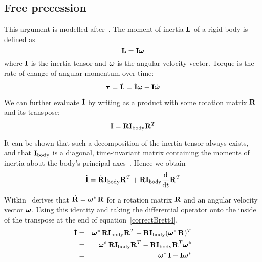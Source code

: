 \subsection{Free precession\label{correctBrettAppendix}}

This argument is modelled after~\cite{Ruf:02}. The moment of inertia $\ve{L}$ of a rigid
body is defined as
\begin{equation}
\label{correctBrett1}
\ve{L} = \m{I}\ve{\omega}
\end{equation}
where $\m{I}$ is the inertia tensor and $\ve{\omega}$ is the angular velocity vector.
Torque is the rate of change of angular momentum over time:
\begin{equation}
\label{correctBrett2}
\ve{\tau} = \dot{\ve{L}} = \dot{\m{I}}\ve{\omega} + \m{I}\dot{\ve{\omega}}
\end{equation}

We can further evaluate $\dot{\m{I}}$ by writing  as a product with some rotation matrix
$\m{R}$ and its transpose:
\begin{equation}
\label{correctBrett3}
\m{I} = \m{R}\m{I}_\mathrm{body}\m{R}^T
\end{equation}

It can be shown that such a decomposition of the inertia tensor always exists, and that
$\m{I}_\mathrm{body}$ is a diagonal, time-invariant matrix containing the moments
of inertia about the body's principal axes~\cite{Feynman:63}. Hence we obtain
\begin{equation}
\label{correctBrett4}
\dot{\m{I}} = \dot{\m{R}}\m{I}_\mathrm{body}\m{R}^T +
    \m{R}\m{I}_\mathrm{body}\frac{\diff}{\diff t}\m{R}^T
\end{equation}

Witkin~\cite{BaraffWitkin:97} derives that $\dot{\m{R}} = \dual{\ve{\omega}}\,\m{R}$
for a rotation matrix $\m{R}$ and an angular velocity vector $\ve{\omega}$.
Using this identity and taking the differential operator onto the inside of the
transpose at the end of equation~\ref{correctBrett4},
\begin{eqnarray}
\dot{\m{I}} &=& \dual{\ve{\omega}}\,\m{R}\m{I}_\mathrm{body}\m{R}^T +
    \m{R}\m{I}_\mathrm{body}(\dual{\ve{\omega}}\,\m{R})^T \nonumber\\
&=& \dual{\ve{\omega}}\,\m{R}\m{I}_\mathrm{body}\m{R}^T -
    \m{R}\m{I}_\mathrm{body}\m{R}^T\dual{\ve{\omega}} \nonumber\\
&=& \dual{\ve{\omega}}\,\m{I} - \m{I}\dual{\ve{\omega}} \label{correctBrett5}
\end{eqnarray}

